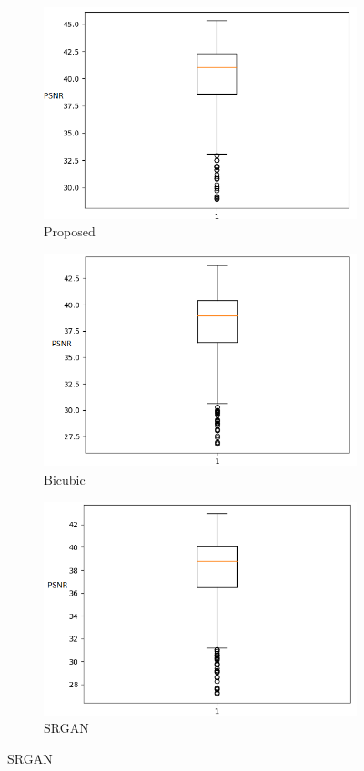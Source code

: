 \begin{figure}[H]
    \centering

    \begin{subfigure}[b]{0.275\textwidth}
    \includegraphics[width=\textwidth]{Chapter7/proposed_y.png}
    \caption{Proposed}
  \end{subfigure}
  \begin{subfigure}[b]{0.275\textwidth}
    \includegraphics[width=\textwidth]{Chapter7/bicubic_y.png}
    \caption{Bicubic}
  \end{subfigure}
  \begin{subfigure}[b]{0.275\textwidth}
    \includegraphics[width=\textwidth]{Chapter7/srgan_y.png}
    \caption{SRGAN}
  \end{subfigure}
  

\end{figure}
